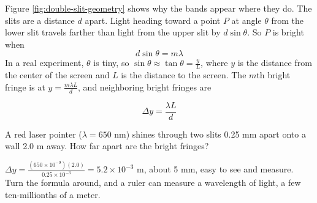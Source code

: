 Figure \ref{fig:double-slit-geometry} shows why the bands appear where they do. The slits are a distance $d$
apart. Light heading toward a point $P$ at angle $\theta$ from the lower slit travels farther than light from the
upper slit by $d\sin\theta$. So $P$ is bright when
$$d\sin\theta = m\lambda$$
In a real experiment, $\theta$ is tiny, so $\sin\theta \approx \tan\theta = \frac{y}{L}$, where $y$ is the distance
from the center of the screen and $L$ is the distance to the screen. The $m$th bright fringe is at
$y = \frac{m\lambda L}{d}$, and neighboring bright fringes are

\begin{mdframed}[style = important, frametitle = {Double-Slit Fringe Spacing}]
$$\Delta y = \frac{\lambda L}{d}$$
\end{mdframed}

\begin{Worked}
\begin{Problem}
A red laser pointer ($\lambda = 650$ nm) shines through two slits 0.25 mm apart onto a wall 2.0 m
away. How far apart are the bright fringes?
\end{Problem}
\begin{Solution}
$\Delta y = \frac{(650 \times 10^{-9})(2.0)}{0.25 \times 10^{-3}} = 5.2 \times 10^{-3}$ m, about 5 mm,
easy to see and measure. Turn the formula around, and a ruler can measure a wavelength of light,
a few ten-millionths of a meter.
\end{Solution}
\end{Worked}

